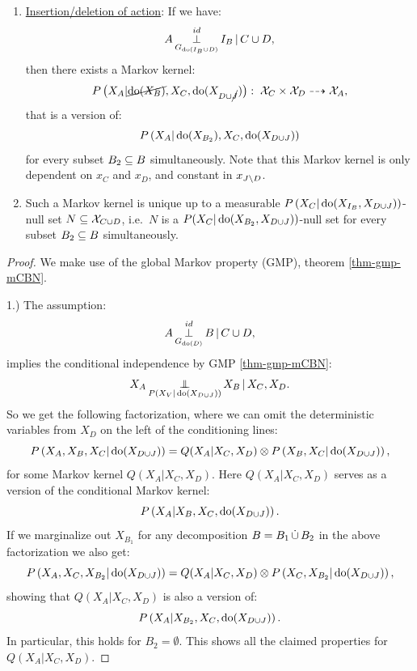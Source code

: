 \begin{Prp}
\begin{enumerate}
            for every decomposition $B=B_1\dcup B_2$ simultaneously.
        \item \underline{Insertion/deletion of action}: If we have:
            \[ A \operatorname*{\perp}^{id}_{G_{\operatorname{do}(I_B \cup D)}} I_B \operatorname*{|} C  \cup D,   \]
            then there exists a Markov kernel: 
            \[P\left ( X_A|\cancel{\operatorname{do}(X_B)},X_C,\operatorname{do}(X_{D\cup \cancel{J}})\right ):\; \mathcal{X}_C \times \mathcal{X}_{D} \dashrightarrow \mathcal{X}_A,\] 
            that is a version of:  
            \[ P\left ( X_A|\operatorname{do}(X_{B_2}),X_C,\operatorname{do}(X_{D\cup J})\right )\]
            for every subset $B_2 \subseteq B$ simultaneously. 
            Note that this Markov kernel is only dependent on $x_C$ and $x_D$, and constant in $x_{J \setminus D}$.
        \item[] Such a Markov kernel is unique up to a measurable $P\left ( X_C|\operatorname{do}(X_{I_B},X_{D\cup J})\right )$-null set $N \subseteq \mathcal{X}_{C\cup D}$, i.e.\ $N$ is a $P(X_C|\operatorname{do}(X_{B_2},X_{D\cup J}))$-null set for every subset $B_2 \subseteq B$ simultaneously.
    \end{enumerate}
\begin{proof}
    We make use of the global Markov property (GMP), theorem \ref{thm-gmp-mCBN}.

1.) The assumption:
            \[ A \operatorname*{\perp}^{id}_{G_{\operatorname{do}(D)}} B \operatorname*{|} C \cup D,   \]
implies the conditional independence by GMP \ref{thm-gmp-mCBN}:
  \[ X_A \operatorname*{\perp\mkern-11mu\perp}_{P(X_V|\operatorname{do}(X_{D\cup J}))} X_B \operatorname*{|} X_C,X_D.\]
So  we get the following factorization, where we can omit the deterministic variables from $X_D$ on the left of the conditioning lines:
  \[ P\left ( X_A,X_B,X_C|\operatorname{do}(X_{D\cup J})\right ) = Q(X_A|X_C,X_D) \otimes P\left ( X_B,X_C|\operatorname{do}(X_{D\cup J})\right ),\]
for some Markov kernel $Q(X_A|X_C,X_D)$. Here
$Q(X_A|X_C,X_D)$ serves as a version of the conditional Markov kernel:
  \[P\left ( X_A|X_B,X_C,\operatorname{do}(X_{D\cup J})\right ).\]
If we marginalize out $X_{B_1}$ for any decomposition $B=B_1 \dcup B_2$ 
in the above factorization we also get:
  \[ P\left ( X_A,X_C,X_{B_2}|\operatorname{do}(X_{D\cup J})\right ) = Q(X_A|X_C,X_D) \otimes P\left ( X_C,X_{B_2}|\operatorname{do}(X_{D\cup J})\right ),\]
showing that $Q(X_A|X_C,X_D)$ is also a version of:
  \[P\left ( X_A|X_{B_2},X_C,\operatorname{do}(X_{D\cup J})\right ).\]
In particular, this holds for $B_2 = \emptyset$. This shows all the claimed properties for $Q(X_A|X_C,X_D)$.


\end{proof}
\end{Prp}
